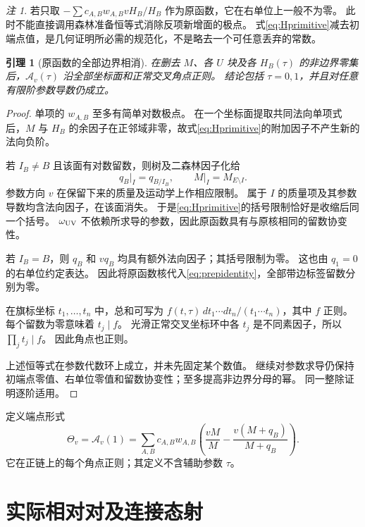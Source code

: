 \documentclass[11pt,a4paper]{ctexart}
\theoremstyle{cnplain}
\newtheorem{lemma}[theorem]{引理}
\theoremstyle{remark}\newtheorem{remark}[theorem]{注}
\begin{document}
\begin{remark}
若只取 $-\sum c_{A,B}w_{A,B}vH_B/H_B$ 作为原函数，它在右单位上一般不为零。
此时不能直接调用森林准备恒等式消除反项新增面的极点。
式\eqref{eq:Hprimitive}减去初端点值，是几何证明所必需的规范化，不是略去一个可任意丢弃的常数。
\end{remark}

\begin{lemma}[原函数的全部边界相消]\label{lem:cancel}
在删去 $M$、各 $U$ 块及各 $H_B(\tau)$ 的非边界零集后，$\mathcal A_v(\tau)$ 沿全部坐标面和正常交叉角点正则。
结论包括 $\tau=0,1$，并且对任意有限阶参数导数仍成立。
\end{lemma}
\begin{proof}
单项的 $w_{A,B}$ 至多有简单对数极点。
在一个坐标面提取共同法向单项式后，$M$ 与 $H_B$ 的余因子在正邻域非零，故式\eqref{eq:Hprimitive}的附加因子不产生新的法向负阶。

若 $I_B\ne B$ 且该面有对数留数，则树及二森林因子化给
\[
 q_B\big|_I=q_{B/I_B},\qquad M\big|_I=M_{E\setminus I}.
\]
参数方向 $v$ 在保留下来的质量及运动学上作相应限制。
属于 $I$ 的质量项及其参数导数均含法向因子，在该面消失。
于是\eqref{eq:Hprimitive}的括号限制恰好是收缩后同一个括号。
$\omega_{\rm UV}$ 不依赖所求导的参数，因此原函数具有与原核相同的留数协变性。

若 $I_B=B$，则 $q_B$ 和 $vq_B$ 均具有额外法向因子；其括号限制为零。
这也由 $q_1=0$ 的右单位约定表达。
因此将原函数核代入\eqref{eq:prepidentity}，全部带边标签留数分别为零。

在旗标坐标 $t_1,\ldots,t_n$ 中，总和可写为
$f(t,\tau)\,dt_1\cdots dt_n/(t_1\cdots t_n)$，其中 $f$ 正则。
每个留数为零意味着 $t_j\mid f$。
光滑正常交叉坐标环中各 $t_j$ 是不同素因子，所以 $\prod_jt_j\mid f$。
因此角点也正则。

上述恒等式在参数代数环上成立，并未先固定某个数值。
继续对参数求导仍保持初端点零值、右单位零值和留数协变性；至多提高非边界分母的幂。
同一整除证明逐阶适用。
\end{proof}

定义端点形式
\begin{equation}\label{eq:Theta}
 \Theta_v=\mathcal A_v(1)
   =\sum_{A,B}c_{A,B}w_{A,B}
       \left(\frac{vM}{M}-\frac{v(M+q_B)}{M+q_B}\right).
\end{equation}
它在正链上的每个角点正则；其定义不含辅助参数 $\tau$。

\section{实际相对对及连接态射}
\end{document}
